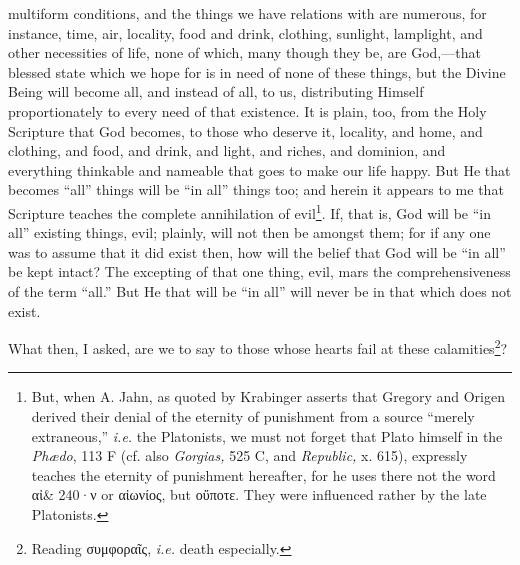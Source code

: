 multiform conditions, and the things we have relations with are numerous, for instance, time, air, locality, food and drink, clothing, sunlight, lamplight, and other necessities of life, none of which, many though they be, are God,—that blessed state which we hope for is in need of none of these things, but the Divine Being will become all, and instead of all, to us, distributing Himself proportionately to every need of that existence. It is plain, too, from the Holy Scripture that God becomes, to those who deserve it, locality, and home, and clothing, and food, and drink, and light, and riches, and dominion, and everything thinkable and nameable that goes to make our life happy. But He that becomes “all” things will be “in all” things too; and herein it appears to me that Scripture teaches the complete annihilation of evil\footnote{But, when A. Jahn, as quoted by Krabinger asserts that Gregory and Origen derived their denial of the eternity of punishment from a source “merely extraneous,” \emph{i.e.} the Platonists, we must not forget that Plato himself in the \emph{Phædo}, 113 F (cf. also \emph{Gorgias,} 525 C, and \emph{Republic,} x. 615), expressly teaches the eternity of punishment hereafter, for he uses there not the word \textgreek{αἰ\& 240·ν} or \textgreek{αἰωνίος}, but \textgreek{οὔποτε}. They were influenced rather by the late Platonists.}. If, that is, God will be “in all” existing things, evil; plainly, will not then be amongst them; for if any one was to assume that it did exist then, how will the belief that God will be “in all” be kept intact? The excepting of that one thing, evil, mars the comprehensiveness of the term “all.” But He that will be “in all” will never be in that which does not exist.

What then, I asked, are we to say to those whose hearts fail at these calamities\footnote{Reading \textgreek{συμφοραῖς}, \emph{i.e.} death especially.}?

